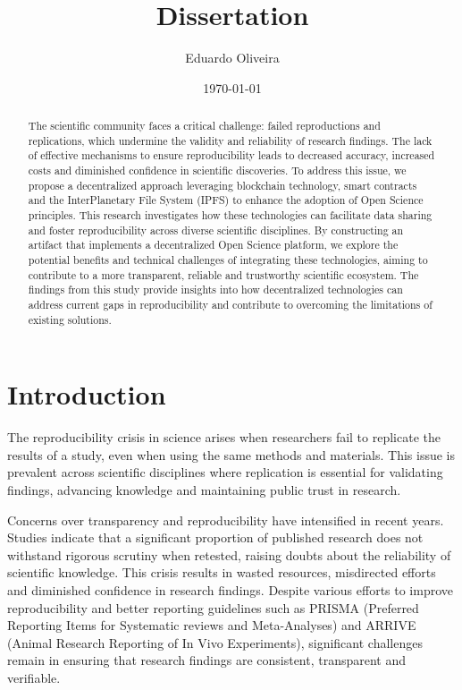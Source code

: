 \documentclass{article}
\title{Dissertation}
\author{Eduardo Oliveira}
\date{\today}
\begin{document}
\maketitle

\begin{abstract}
    The scientific community faces a critical challenge: failed reproductions and replications, which undermine the validity and reliability of research findings. The lack of effective mechanisms to ensure reproducibility leads to decreased accuracy, increased costs and diminished confidence in scientific discoveries. To address this issue, we propose a decentralized approach leveraging blockchain technology, smart contracts and the  InterPlanetary File System (IPFS) to enhance the adoption of Open Science principles. This research investigates how these technologies can facilitate data sharing and foster reproducibility across diverse scientific disciplines. By constructing an artifact that implements a decentralized Open Science platform, we explore the potential benefits and technical challenges of integrating these technologies, aiming to contribute to a more transparent, reliable and trustworthy scientific ecosystem. The findings from this study provide insights into how decentralized technologies can address current gaps in reproducibility and contribute to overcoming the limitations of existing solutions.
\end{abstract}


\section{Introduction}


The reproducibility crisis in science arises when researchers fail to replicate the results of a study, even when using the same methods and materials. This issue is prevalent across scientific disciplines where replication is essential for validating findings, advancing knowledge and maintaining public trust in research.

Concerns over transparency and reproducibility have intensified in recent years. Studies indicate that a significant proportion of published research does not withstand rigorous scrutiny when retested, raising doubts about the reliability of scientific knowledge. This crisis results in wasted resources, misdirected efforts and diminished confidence in research findings. Despite various efforts to improve reproducibility and better reporting guidelines such as PRISMA (Preferred Reporting Items for Systematic reviews and Meta-Analyses) and ARRIVE (Animal Research Reporting of In Vivo Experiments), significant challenges remain in ensuring that research findings are consistent, transparent and verifiable.
\end{document}
